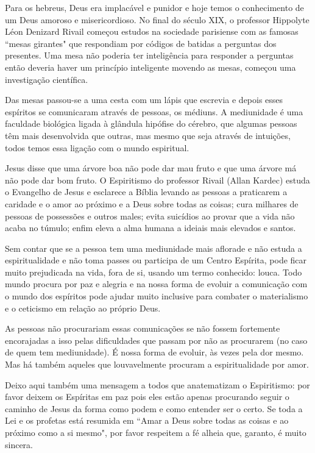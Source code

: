 \emdash{}Para os hebreus, Deus era implacável e punidor e hoje temos o conhecimento de um Deus amoroso e misericordioso. No final do século XIX, o  professor Hippolyte Léon Denizard Rivail começou estudos na sociedade parisiense com as famosas ``mesas girantes" que respondiam por códigos de batidas a perguntas dos presentes. Uma mesa não poderia ter inteligência para responder a perguntas então deveria haver um princípio inteligente movendo as mesas, começou uma investigação científica.

\emdash{}Das mesas passou-se a uma cesta com um lápis que escrevia e depois esses espíritos se comunicaram através de pessoas, os médiuns. A mediunidade é uma faculdade biológica ligada à glândula hipófise do cérebro, que algumas pessoas têm mais desenvolvida que outras, mas mesmo que seja através de intuições, todos temos essa ligação com o mundo espiritual.

\emdash{}Jesus disse que uma árvore boa não pode dar mau fruto e que uma árvore má não pode dar bom fruto. O Espiritismo do professor Rivail (Allan Kardec) estuda o Evangelho de Jesus e esclarece a Bíblia levando as pessoas a praticarem a caridade e o amor ao próximo e a Deus sobre todas as coisas; cura milhares de pessoas de possessões e outros males; evita suicídios ao provar que a vida não acaba no túmulo; enfim eleva a alma humana a ideiais mais elevados e santos.

\emdash{}Sem contar que se a pessoa tem uma mediunidade mais aflorade e não estuda a espiritualidade e não toma passes ou participa de um Centro Espírita, pode ficar muito prejudicada na vida, fora de si, usando um termo conhecido: louca. Todo mundo procura por paz e alegria e na nossa forma de evoluir a comunicação com o mundo dos espíritos pode ajudar muito inclusive para combater o materialismo e o ceticismo em relação ao próprio Deus.

\emdash{}As pessoas não procurariam essas comunicações se não fossem fortemente encorajadas a isso pelas dificuldades que passam por não as procurarem (no caso de quem tem mediunidade). É nossa forma de evoluir, às vezes pela dor mesmo. Mas há também aqueles que louvavelmente procuram a espiritualidade por amor.

\emdash{}Deixo aqui também uma mensagem a todos que anatematizam o Espiritismo: por favor deixem os Espíritas em paz pois eles estão apenas procurando seguir o caminho de Jesus da forma como podem e como entender ser o certo. Se toda a Lei e os profetas está resumida em ``Amar a Deus sobre todas as coisas e ao próximo como a si mesmo", por favor respeitem a fé alheia que, garanto, é muito sincera.